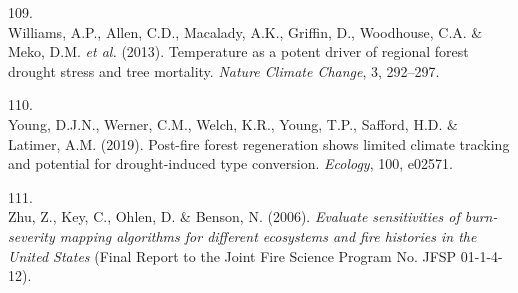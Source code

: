 \documentclass[]{article}
\begin{document}
\leavevmode\hypertarget{ref-parkwilliams2013}{}%
109.\\
Williams, A.P., Allen, C.D., Macalady, A.K., Griffin, D., Woodhouse,
C.A. \& Meko, D.M. \emph{et al.} (2013). Temperature as a potent driver
of regional forest drought stress and tree mortality. \emph{Nature
Climate Change}, 3, 292--297.

\leavevmode\hypertarget{ref-young2019}{}%
110.\\
Young, D.J.N., Werner, C.M., Welch, K.R., Young, T.P., Safford, H.D. \&
Latimer, A.M. (2019). Post-fire forest regeneration shows limited
climate tracking and potential for drought-induced type conversion.
\emph{Ecology}, 100, e02571.

\leavevmode\hypertarget{ref-zhu2006}{}%
111.\\
Zhu, Z., Key, C., Ohlen, D. \& Benson, N. (2006). \emph{Evaluate
sensitivities of burn-severity mapping algorithms for different
ecosystems and fire histories in the United States} (Final Report to the
Joint Fire Science Program No. JFSP 01-1-4-12).
\end{document}
